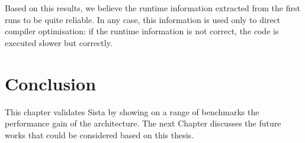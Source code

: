 \documentclass[a4paper,12pt,twoside]{../includes/ThesisStyle}
\begin{document}
Based on this results, we believe the runtime information extracted from the first runs to be quite reliable. In any case, this information is used only to direct compiler optimisation: if the runtime information is not correct, the code is executed slower but correctly.


\section*{Conclusion}

This chapter validates Sista by showing on a range of benchmarks the performance gain of the architecture. The next Chapter discusses the future works that could be considered based on this thesis.

\ifx\wholebook\relax\else
    
\end{document}
